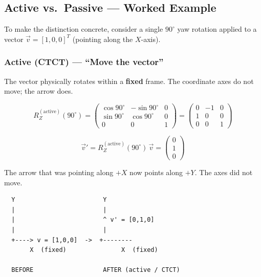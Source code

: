 \documentclass[12pt,a4paper]{article}
\begin{document}
\subsection{Active vs.\ Passive --- Worked Example}

To make the distinction concrete, consider a single $90^\circ$ yaw rotation
applied to a vector $\vec{v}=[1,0,0]^T$ (pointing along the $X$-axis).

\subsubsection*{Active (CTCT) --- ``Move the vector''}

The vector physically rotates within a \textbf{fixed} frame.  The coordinate
axes do not move; the arrow does.

\begin{equation}
  R_Z^{(\text{active})}(90^\circ)
  = \begin{pmatrix}
      \cos 90^\circ & -\sin 90^\circ & 0 \\
      \sin 90^\circ &  \cos 90^\circ & 0 \\
      0             &  0             & 1
    \end{pmatrix}
  = \begin{pmatrix} 0 & -1 & 0 \\ 1 & 0 & 0 \\ 0 & 0 & 1 \end{pmatrix}
\end{equation}

\begin{equation}
  \vec{v}' = R_Z^{(\text{active})}(90^\circ)\,\vec{v}
  = \begin{pmatrix} 0\\1\\0 \end{pmatrix}
\end{equation}

The arrow that was pointing along $+X$ now points along $+Y$.
The axes did not move.

\begin{verbatim}
  Y                        Y
  |                        |
  |                        ^ v' = [0,1,0]
  |                        |
  +----> v = [1,0,0]  ->  +--------
       X  (fixed)               X  (fixed)

  BEFORE                   AFTER (active / CTCT)
\end{verbatim}
\end{document}

